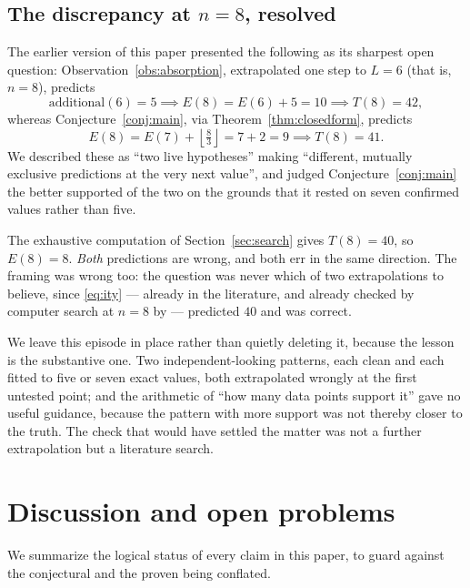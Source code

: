 \documentclass[11pt]{amsart}
\theoremstyle{plain}
\theoremstyle{definition}
\theoremstyle{remark}
\begin{document}
\subsection{The discrepancy at $n=8$, resolved}
\label{sec:resolved}

The earlier version of this paper presented the following as its sharpest open question: Observation~\ref{obs:absorption}, extrapolated one step to $L=6$ (that is, $n=8$), predicts
\[
\mathrm{additional}(6) = 5 \implies E(8) = E(6)+5 = 10 \implies T(8) = 42,
\]
whereas Conjecture~\ref{conj:main}, via Theorem~\ref{thm:closedform}, predicts
\[
E(8) = E(7) + \left\lfloor \tfrac{8}{3}\right\rfloor = 7+2 = 9 \implies T(8) = 41.
\]
We described these as ``two live hypotheses'' making ``different, mutually exclusive predictions at the very next value'', and judged Conjecture~\ref{conj:main} the better supported of the two on the grounds that it rested on seven confirmed values rather than five.

The exhaustive computation of Section~\ref{sec:search} gives $T(8)=40$, so $E(8)=8$. \emph{Both} predictions are wrong, and both err in the same direction. The framing was wrong too: the question was never which of two extrapolations to believe, since \eqref{eq:ity} --- already in the literature, and already checked by computer search at $n=8$ by \cite{ITY} --- predicted $40$ and was correct.

We leave this episode in place rather than quietly deleting it, because the lesson is the substantive one. Two independent-looking patterns, each clean and each fitted to five or seven exact values, both extrapolated wrongly at the first untested point; and the arithmetic of ``how many data points support it'' gave no useful guidance, because the pattern with more support was not thereby closer to the truth. The check that would have settled the matter was not a further extrapolation but a literature search.

\section{Discussion and open problems}
\label{sec:open}

We summarize the logical status of every claim in this paper, to guard against the conjectural and the proven being conflated.
\end{document}
